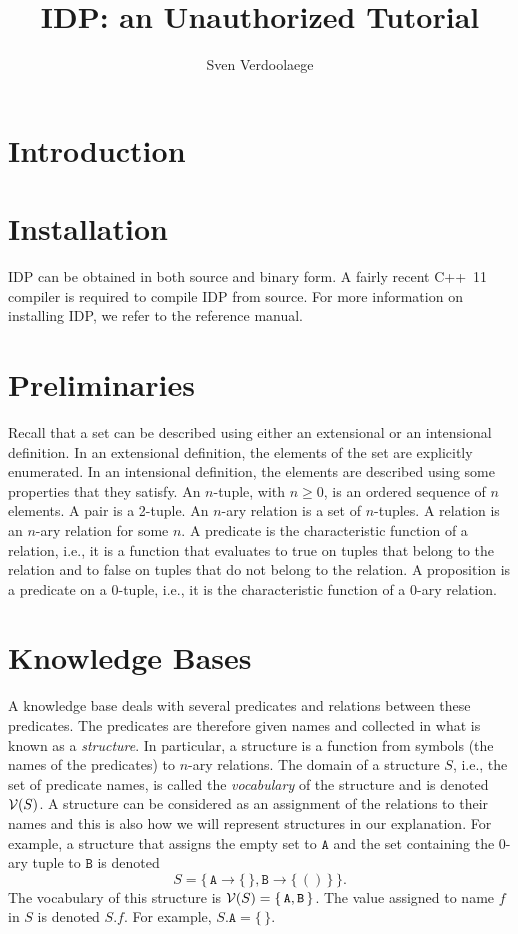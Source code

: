 \documentclass{article}
\newcommand{\idp}{{\sc IDP}\xspace}
\newcommand{\voc}[1]{{\cal V}(#1)}
\begin{document}
\title{\idp: an Unauthorized Tutorial}
\author{Sven Verdoolaege}
\maketitle

\section{Introduction}

\section{Installation}

\idp can be obtained in both source and binary form.
A fairly recent \mbox{C++ 11} compiler is required to compile \idp from source.
For more information on installing \idp, we refer to the reference manual.

\section{Preliminaries}

Recall that a set can be described using either an extensional
or an intensional definition.  In an extensional definition,
the elements of the set are explicitly enumerated.
In an intensional definition, the elements are described
using some properties that they satisfy.
An $n$-tuple, with $n \ge 0$, is an ordered sequence of $n$ elements.
A pair is a 2-tuple.
An $n$-ary relation is a set of $n$-tuples.
A relation is an $n$-ary relation for some $n$.
A predicate is the characteristic function of a relation,
i.e., it is a function that evaluates to true on tuples that belong
to the relation and to false on tuples that do not belong
to the relation.
A proposition is a predicate on a $0$-tuple, i.e.,
it is the characteristic function of a $0$-ary relation.

\section{Knowledge Bases}

A knowledge base deals with several predicates and relations between
these predicates.
The predicates are therefore given names and collected in what
is known as a \emph{structure}.
In particular, a structure is a function from symbols (the names
of the predicates) to $n$-ary relations.
The domain of a structure $S$, i.e., the set of predicate names,
is called the \emph{vocabulary} of the structure and is denoted
$\voc{S}$.  A structure can be considered as an assignment
of the relations to their names and this is also how we will
represent structures in our explanation.
For example, a structure that assigns the empty set to $\mathtt{A}$
and the set containing the $0$-ary tuple to $\mathtt{B}$ is denoted
$$
S =
\{\,
\mathtt{A} \to \{\,\},
\mathtt{B} \to \{\, () \,\}
\,\}
.
$$
The vocabulary of this structure is
$\voc{S} = \{\, \mathtt{A}, \mathtt{B} \,\}$.
The value assigned to name $f$ in $S$ is denoted $S.f$.
For example, $S.\mathtt{A} = \{\,\}$.
\end{document}
